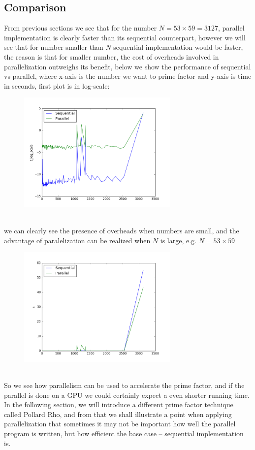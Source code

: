 \documentclass[10pt]{article}
\begin{document}
\subsection{Comparison}
From previous sections we see that for the number $N=53\times59=3127$, parallel implementation is clearly faster than its sequential counterpart, however we will see that for number smaller than $N$ sequential implementation would be faster, the reason is that for smaller number, the cost of overheads involved in parallelization outweighs its benefit, below we show the performance of sequential vs parallel, where x-axis is the number we want to prime factor and y-axis is time in seconds, first plot is in log-scale:
\begin{figure}[h!]
	\centering
	\includegraphics[width=0.7\textwidth]{figure_1.png}
\end{figure}\\
we can clearly see the presence of overheads when numbers are small, and the advantage of paralelization can be realized when $N$ is large, e.g. $N=53\times59$ \\
\begin{figure}[h!]
	\centering
	\includegraphics[width=0.7\textwidth]{figure_2.png}
\end{figure} \\
So we see how parallelism can be used to accelerate the prime factor, and if the parallel is done on a GPU we could certainly expect a even shorter running time. In the following section, we will introduce a different prime factor technique called Pollard Rho, and from that we shall illustrate a point when applying parallelization that sometimes it may not be important how well the parallel program is written, but how efficient the base case -- sequential implementation is.
\end{document}
